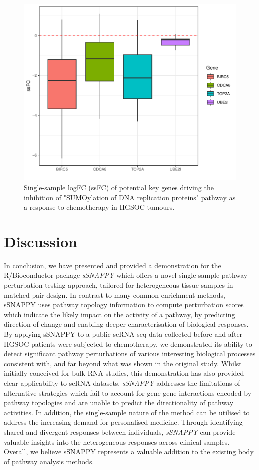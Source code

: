 \documentclass[9pt,a4paper,]{extarticle}
\begin{document}
\begin{figure}

{\centering \includegraphics[width=0.8\linewidth]{sSNAPPY_paper_files/figure-latex/Figure8-1} 

}

\caption{Single-sample logFC (ssFC) of potential key genes driving the inhibition of "SUMOylation of DNA replication proteins" pathway as a response to chemotherapy in HGSOC tumours.}\label{fig:Figure8}
\end{figure}

\hypertarget{discussion}{%
\section{Discussion}\label{discussion}}

In conclusion, we have presented and provided a demonstration for the R/Bioconductor package \emph{sSNAPPY} which offers a novel single-sample pathway perturbation testing approach, tailored for heterogeneous tissue samples in matched-pair design.
In contrast to many common enrichment methods, sSNAPPY uses pathway topology information to compute perturbation scores which indicate the likely impact on the activity of a pathway, by predicting direction of change and enabling deeper characterisation of biological responses.
By applying sSNAPPY to a public scRNA-seq data collected before and after HGSOC patients were subjected to chemotherapy, we demonstrated its ability to detect significant pathway perturbations of various interesting biological processes consistent with, and far beyond what was shown in the original study.
Whilst initially conceived for bulk-RNA studies, this demonstration has also provided clear applicability to scRNA datasets.
\emph{sSNAPPY} addresses the limitations of alternative strategies which fail to account for gene-gene interactions encoded by pathway topologies and are unable to predict the directionality of pathway activities.
In addition, the single-sample nature of the method can be utilised to address the increasing demand for personalised medicine.
Through identifying shared and divergent responses between individuals, \emph{sSNAPPY} can provide valuable insights into the heterogeneous responses across clinical samples.
Overall, we believe sSNAPPY represents a valuable addition to the existing body of pathway analysis methods.
\end{document}
